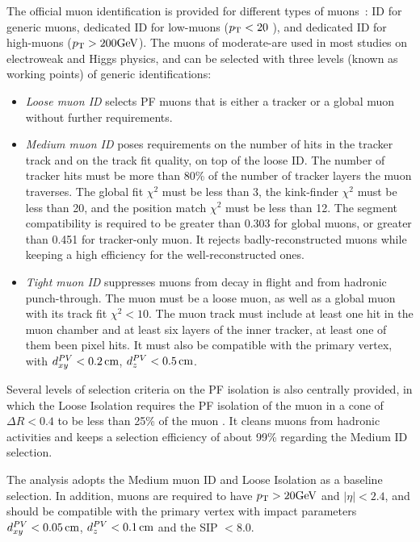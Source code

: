 The official muon identification is provided for different types of muons~\cite{Sirunyan_2018}: 
ID for generic muons, dedicated ID for low-\pt muons ($p_{\mathrm{T}} < 20$ \GeV), and dedicated ID for high-\pt muons ($p_{\mathrm{T}} > 200 \mbox{GeV}$).
The muons of moderate-\pt are used in most studies on electroweak and Higgs physics, 
and can be selected with three levels (known as working points) of generic identifications:
\begin{itemize}
    \item \textit{Loose muon ID}
          selects PF muons that is either a tracker or a global muon without further requirements.
    \item \textit{Medium muon ID}
          poses requirements on the number of hits in the tracker track and on the track fit quality, on top of the loose ID.
          The number of tracker hits must be more than 80\% of the number of tracker layers the muon traverses.
          The global fit $\chi^{2}$ must be less than 3, the kink-finder $\chi^{2}$ must be less than 20, 
          and the position match $\chi^{2}$ must be less than 12.
          The segment compatibility is required to be greater than 0.303 for global muons, or greater than 0.451 for tracker-only muon.
          It rejects badly-reconstructed muons while keeping a high efficiency for the well-reconstructed ones.
    \item \textit{Tight muon ID}
          suppresses muons from decay in flight and from hadronic punch-through.
          The muon must be a loose muon, as well as a global muon with its track fit $\chi^{2} < 10$.
          The muon track must include at least one hit in the muon chamber and at least six layers of the inner tracker, at least one of them been pixel hits.
          It must also be compatible with the primary vertex, with $d^{PV}_{xy} < 0.2 \,\text{cm}$, $d^{PV}_{z} < 0.5 \,\text{cm}$.
\end{itemize}

Several levels of selection criteria on the PF isolation is also centrally provided, 
in which the Loose Isolation requires the PF isolation of the muon in a cone of $\Delta{}R < 0.4$ to be less than 25\% of the muon \pt.
It cleans muons from hadronic activities and keeps a selection efficiency of about 99\% regarding the Medium ID selection.

The \hmm analysis adopts the Medium muon ID and Loose Isolation as a baseline selection.
In addition, muons are required to have $p_{\mathrm{T}} > 20 \mbox{GeV}$ and $|\eta| < 2.4$,
and should be compatible with the primary vertex with impact parameters
$d^{PV}_{xy} < 0.05 \,\text{cm}$, $d^{PV}_{z} < 0.1 \,\text{cm}$ and the SIP $< 8.0$. 

